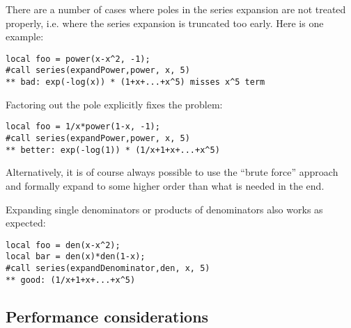\documentclass[titlepage]{article}
\begin{document}
There are a number of cases where poles in the series expansion are not
treated properly, i.e. where the series expansion is truncated too
early. Here is one example:
\begin{lstlisting}
local foo = power(x-x^2, -1);
#call series(expandPower,power, x, 5)
** bad: exp(-log(x)) * (1+x+...+x^5) misses x^5 term
\end{lstlisting}
Factoring out the pole explicitly fixes the problem:
\begin{lstlisting}
local foo = 1/x*power(1-x, -1);
#call series(expandPower,power, x, 5)
** better: exp(-log(1)) * (1/x+1+x+...+x^5)
\end{lstlisting}
Alternatively, it is of course always possible to use the ``brute
force'' approach and formally expand to some higher order than what is
needed in the end.

Expanding single denominators or products of denominators also works as
expected:
\begin{lstlisting}
local foo = den(x-x^2);
local bar = den(x)*den(1-x);
#call series(expandDenominator,den, x, 5)
** good: (1/x+1+x+...+x^5)
\end{lstlisting}

\subsection{Performance considerations}
\label{sec:perf}
\end{document}

